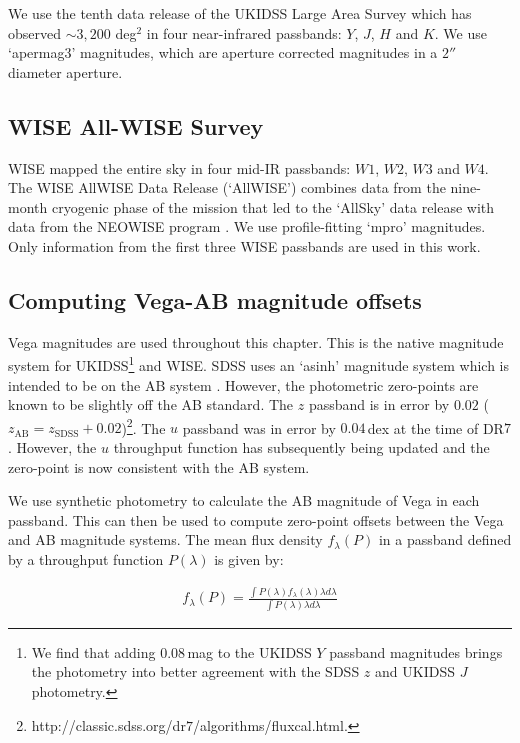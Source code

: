 We use the tenth data release of the UKIDSS Large Area Survey which has observed $\sim 3,200$ deg$^2$ in four near-infrared passbands: $Y$, $J$, $H$ and $K$. 
We use `apermag$3$' magnitudes, which are aperture corrected magnitudes in a $2''$ diameter aperture.

\subsection{WISE All-WISE Survey}

WISE mapped the entire sky in four mid-IR passbands: $W1$, $W2$, $W3$ and $W4$. 
The WISE AllWISE Data Release (`AllWISE') combines data from the nine-month cryogenic phase of the mission that led to the `AllSky' data release with data from the NEOWISE program \citep{mainzer11}. 
We use profile-fitting `mpro' magnitudes.   
Only information from the first three WISE passbands are used in this work.

\subsection{Computing Vega-AB magnitude offsets}

Vega magnitudes are used throughout this chapter. 
This is the native magnitude system for UKIDSS\footnote{We find that adding $0.08$\,mag to the UKIDSS $Y$ passband magnitudes brings the photometry into better agreement with the SDSS $z$ and UKIDSS $J$ photometry.} and WISE.
SDSS uses an `asinh' magnitude system \citep{lupton99} which is intended to be on the AB system \citep{oke83}.
However, the photometric zero-points are known to be slightly off the AB standard. 
The $z$ passband is in error by $0.02$ ($z_{\text{AB}} = z_{\text{SDSS}} + 0.02$)\footnote{http://classic.sdss.org/dr$7$/algorithms/fluxcal.html.}.
The $u$ passband was in error by $0.04$\,dex at the time of DR$7$. 
However, the $u$ throughput function has subsequently being updated \citep{doi10} and the zero-point is now consistent with the AB system.  

We use synthetic photometry to calculate the AB magnitude of Vega in each passband. 
This can then be used to compute zero-point offsets between the Vega and AB magnitude systems. 
The mean flux density $f_\lambda(P)$ in a passband defined by a throughput function $P(\lambda)$ is given by: 

\begingroup\makeatletter{}\check@mathfonts
\begin{eqnarray}
\label{eq:flux}
  f_\lambda(P) = \frac {\int P(\lambda)f_\lambda(\lambda)\lambda d\lambda} {\int P(\lambda)\lambda d\lambda} 
\end{eqnarray}
\endgroup

